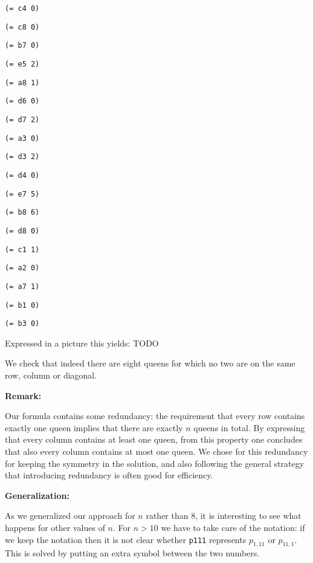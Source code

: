 \documentclass[12pt]{article}
\begin{document}
{\tt (= c4 0) }

{\tt (= c8 0) }

{\tt (= b7 0) }

{\tt (= e5 2) }

{\tt (= a8 1) }

{\tt (= d6 0) }

{\tt (= d7 2) }

{\tt (= a3 0) }

{\tt (= d3 2) }

{\tt (= d4 0) }

{\tt (= e7 5) }

{\tt (= b8 6) }

{\tt (= d8 0) }

{\tt (= c1 1) }

{\tt (= a2 0) }

{\tt (= a7 1) }

{\tt (= b1 0) }

{\tt (= b3 0) }

{\tt  }

Expressed in a picture this yields: TODO


\vspace{3mm}


\vspace{3mm}

We check that indeed there are eight queens for which no two are
on the same row, column or diagonal.

\vspace{3mm}

{\bf Remark:} 

Our formula contains some redundancy: the requirement that every
row contains exactly one queen implies that there are exactly $n$
queens in total. By expressing that every column contains at least
one queen, from this property one concludes that also every column
contains at most one queen. We chose for this redundancy for
keeping the symmetry in the solution, and also following the
general strategy that introducing redundancy is often good for
efficiency.

\vspace{3mm}

{\bf Generalization:} 

As we generalized our approach for $n$ rather than 8, it is
interesting to see what happens for other values of $n$. For $n
> 10$ we have to take care of the notation: if we keep the
notation then it is not clear whether {\tt p111} represents 
$p_{1,11}$ or $p_{11,1}$. This is solved by putting an extra 
symbol between the two numbers. 
\end{document}
